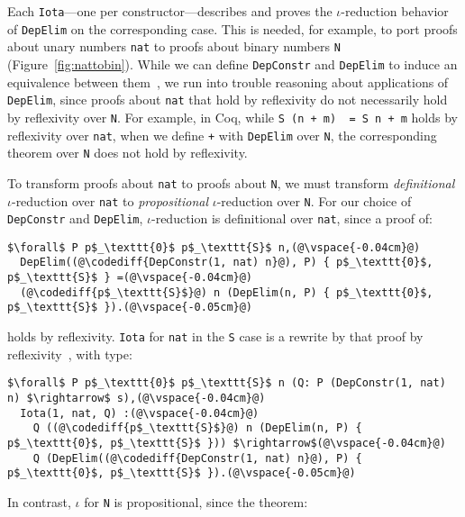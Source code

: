 Each \lstinline{Iota}---one per constructor---describes and proves the $\iota$-reduction behavior
of \lstinline{DepElim} on the corresponding case.
This is needed, for example, to port proofs about unary numbers \lstinline{nat} to
proofs about binary numbers \lstinline{N} (Figure~\ref{fig:nattobin}).
While we can define \lstinline{DepConstr} and \lstinline{DepElim} to induce an equivalence
between them~\href{https://github.com/uwplse/pumpkin-pi/blob/v2.0.0/plugin/coq/nonorn.v}{}, %
we run into trouble reasoning about applications of \lstinline{DepElim},
since proofs about \lstinline{nat} that hold by reflexivity do not necessarily hold by reflexivity over \lstinline{N}. 
For example, in Coq, while \lstinline{S (n + m)  = S n + m} holds by reflexivity over \lstinline{nat},
when we define \lstinline{+} with \lstinline{DepElim} over \lstinline{N},
the corresponding theorem over \lstinline{N} does not hold by reflexivity.

To transform proofs about \lstinline{nat} to proofs about \lstinline{N}, we must transform \textit{definitional} $\iota$-reduction over \lstinline{nat} to \textit{propositional} $\iota$-reduction over \lstinline{N}.
For our choice of \lstinline{DepConstr} and \lstinline{DepElim},
$\iota$-reduction is definitional over \lstinline{nat}, since a proof of:

\begin{lstlisting}
$\forall$ P p$_\texttt{0}$ p$_\texttt{S}$ n,(@\vspace{-0.04cm}@)
  DepElim((@\codediff{DepConstr(1, nat) n}@), P) { p$_\texttt{0}$, p$_\texttt{S}$ } =(@\vspace{-0.04cm}@)
  (@\codediff{p$_\texttt{S}$}@) n (DepElim(n, P) { p$_\texttt{0}$, p$_\texttt{S}$ }).(@\vspace{-0.05cm}@)
\end{lstlisting}
holds by reflexivity.
\lstinline{Iota} for \lstinline{nat} in the \lstinline{S} case is a rewrite by that proof by reflexivity~\href{https://github.com/uwplse/pumpkin-pi/blob/v2.0.0/plugin/coq/nonorn.v}{},
with type:

\begin{lstlisting}
$\forall$ P p$_\texttt{0}$ p$_\texttt{S}$ n (Q: P (DepConstr(1, nat) n) $\rightarrow$ s),(@\vspace{-0.04cm}@)
  Iota(1, nat, Q) :(@\vspace{-0.04cm}@)
    Q ((@\codediff{p$_\texttt{S}$}@) n (DepElim(n, P) { p$_\texttt{0}$, p$_\texttt{S}$ })) $\rightarrow$(@\vspace{-0.04cm}@)
    Q (DepElim((@\codediff{DepConstr(1, nat) n}@), P) { p$_\texttt{0}$, p$_\texttt{S}$ }).(@\vspace{-0.05cm}@)
\end{lstlisting}
In contrast, $\iota$ for \lstinline{N} is propositional, since the 
theorem: %

